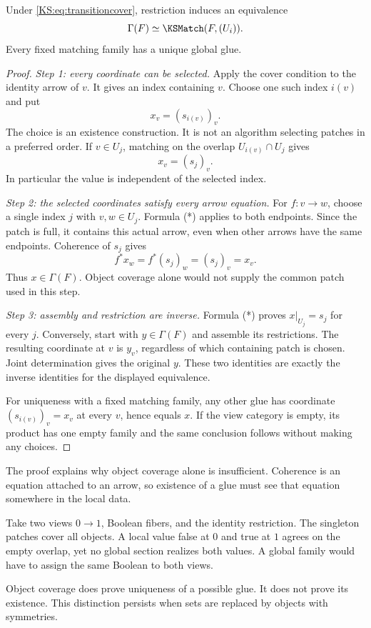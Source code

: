 \begin{KStheorem}\label{KS:KS04}
Under \eqref{KS:eq:transitioncover}, restriction induces an equivalence
\[
 \Gamma(F)\simeq\KSMatch(F,(U_i)).
\]
Every fixed matching family has a unique global glue.
\end{KStheorem}
\begin{proof}
\emph{Step 1: every coordinate can be selected.} Apply the cover condition to the identity arrow of $v$. It gives an index containing $v$. Choose one such index $i(v)$ and put
\[
 x_v=(s_{i(v)})_v.
\]
The choice is an existence construction. It is not an algorithm selecting patches in a preferred order. If $v\in U_j$, matching on the overlap $U_{i(v)}\cap U_j$ gives
\[
 x_v=(s_j)_v.                                                   \tag{*}
\]
In particular the value is independent of the selected index.

\emph{Step 2: the selected coordinates satisfy every arrow equation.} For $f:v\to w$, choose a single index $j$ with $v,w\in U_j$. Formula (*) applies to both endpoints. Since the patch is full, it contains this actual arrow, even when other arrows have the same endpoints. Coherence of $s_j$ gives
\[
 f^*x_w=f^*(s_j)_w=(s_j)_v=x_v.
\]
Thus $x\in\Gamma(F)$. Object coverage alone would not supply the common patch used in this step.

\emph{Step 3: assembly and restriction are inverse.} Formula (*) proves $x|_{U_j}=s_j$ for every $j$. Conversely, start with $y\in\Gamma(F)$ and assemble its restrictions. The resulting coordinate at $v$ is $y_v$, regardless of which containing patch is chosen. Joint determination gives the original $y$. These two identities are exactly the inverse identities for the displayed equivalence.

For uniqueness with a fixed matching family, any other glue has coordinate $(s_{i(v)})_v=x_v$ at every $v$, hence equals $x$. If the view category is empty, its product has one empty family and the same conclusion follows without making any choices.
\end{proof}
The proof explains why object coverage alone is insufficient. Coherence is an equation attached to an arrow, so existence of a glue must see that equation somewhere in the local data.

\begin{KSexample}\label{KS:KS05}
Take two views \(0\to1\), Boolean fibers, and the identity restriction. The singleton patches cover all objects. A local value false at \(0\) and true at \(1\) agrees on the empty overlap, yet no global section realizes both values. A global family would have to assign the same Boolean to both views.
\end{KSexample}
Object coverage does prove uniqueness of a possible glue. It does not prove its existence. This distinction persists when sets are replaced by objects with symmetries.

